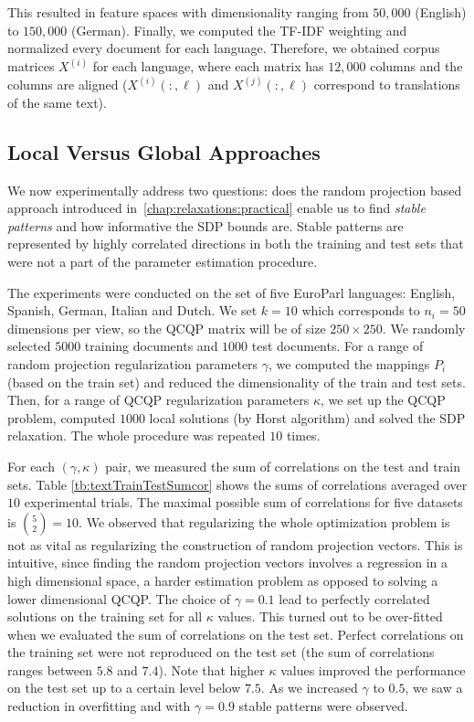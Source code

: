 This resulted in feature spaces with
dimensionality ranging from $50,000$ (English) to $150,000$
(German). Finally, we computed the TF-IDF weighting and normalized
every document for each language. Therefore, we obtained
corpus matrices $X^{(i)}$ for each language, where each
matrix has $12,000$ columns and the columns are aligned
($X^{(i)}\left(:,\ell\right)$ and $X^{(j)}\left(:,\ell\right)$ correspond to
translations of the same text). 

\subsection{Local Versus Global Approaches}

We now experimentally address two questions: does the random projection
based approach introduced in~\ref{chap:relaxations:practical} enable us to 
find \emph{stable patterns} and how informative the SDP
bounds are. Stable patterns are represented by highly correlated directions
in both the training and test sets that were not a part of the parameter
estimation procedure.

The experiments were conducted on the set of five EuroParl
languages: English, Spanish, German, Italian and Dutch. We set
$k = 10$ which corresponds to $n_i = 50$ dimensions per view, so
the QCQP matrix will be of size $250 \times 250$. We randomly
selected $5000$ training documents and $1000$ test documents.  For
a range of random projection regularization parameters $\gamma$,
we computed the mappings $P_i$ (based on the train set) and
reduced the dimensionality of the train and test sets. Then, for
a range of QCQP regularization parameters $\kappa$, we set up the
QCQP problem, computed $1000$ local solutions (by Horst
algorithm) and solved the SDP relaxation. The whole procedure was
repeated $10$ times.

For each $(\gamma, \kappa)$ pair, we measured the sum of
correlations on the test and train sets. Table
\ref{tb:textTrainTestSumcor} shows the sums of correlations
averaged over $10$ experimental trials. The maximal possible sum
of correlations for five datasets is $\binom{5}{2} = 10$.
We observed that regularizing the whole optimization problem is
not as vital as regularizing the construction of random
projection vectors. This is intuitive, since finding the
random projection vectors involves a regression in a high
dimensional space, a harder estimation problem as opposed to 
solving a lower dimensional QCQP. 
The choice of $\gamma = 0.1$ lead to perfectly correlated
solutions on the training set for all $\kappa$ values. This turned out to
be over-fitted when we evaluated the sum of correlations on the
test set. Perfect correlations on the training set were not reproduced on 
the test set (the sum of correlations ranges between $5.8$ and $7.4$).
Note that higher $\kappa$ values improved the
performance on the test set up to a certain level below
$7.5$. As we increased $\gamma$ to $0.5$, we saw a reduction in
overfitting and with $\gamma = 0.9$  stable patterns were observed. 

